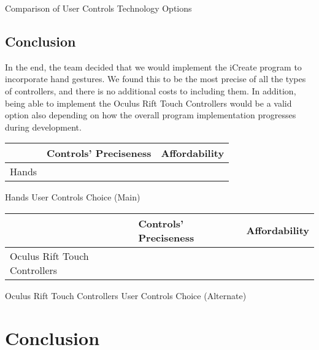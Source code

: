 \documentclass[letterpaper,10pt,onecolumn,compsoc]{IEEEtran}
\begin{document}
\begin{center}
Comparison of User Controls Technology Options
\end{center}

\subsection{Conclusion}
In the end, the team decided that we would implement the iCreate program to incorporate hand gestures. We found this to be the most precise of all the types of controllers, and there is no additional costs to including them. In addition, being able to implement the Oculus Rift Touch Controllers would be a valid option also depending on how the overall program implementation progresses during development.

\newpage


\begin{center}
\begin{tabular}{ | P{4.5cm} | P{3.5cm} | P{2.5cm} | } 
 	\hline
 	 & Controls' Preciseness & Affordability \\ 
 	\hline 		
 	Hands & \checkmark & \checkmark \\ 
 	\hline
\end{tabular}
\end{center}

\begin{center}
Hands User Controls Choice (Main)
\end{center}

\begin{center}
\begin{tabular}{ | P{4.5cm} | P{3.5cm} | P{2.5cm} | } 
 	\hline
 	 & Controls' Preciseness & Affordability \\ 
 	\hline 		
 	Oculus Rift Touch Controllers & \checkmark & \checkmark \\ 
 	\hline
\end{tabular}
\end{center}

\begin{center}
Oculus Rift Touch Controllers User Controls Choice (Alternate)
\end{center}

\newpage

\section{Conclusion}
\end{document}
